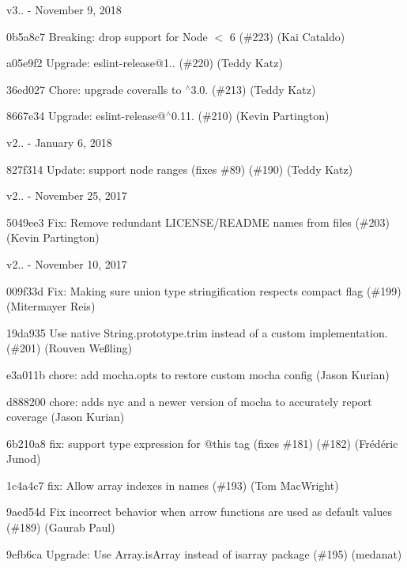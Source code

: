 v3.. -\/ November 9, 2018


\begin{DoxyItemize}
\item 0b5a8c7 Breaking\+: drop support for Node \texorpdfstring{$<$}{<} 6 (\#223) (Kai Cataldo)
\item a05e9f2 Upgrade\+: eslint-\/release@1.. (\#220) (Teddy Katz)
\item 36ed027 Chore\+: upgrade coveralls to $^\wedge$3.0. (\#213) (Teddy Katz)
\item 8667e34 Upgrade\+: eslint-\/release@$^\wedge$0.11. (\#210) (Kevin Partington)
\end{DoxyItemize}

v2.. -\/ January 6, 2018


\begin{DoxyItemize}
\item 827f314 Update\+: support node ranges (fixes \#89) (\#190) (Teddy Katz)
\end{DoxyItemize}

v2.. -\/ November 25, 2017


\begin{DoxyItemize}
\item 5049ee3 Fix\+: Remove redundant LICENSE/\+README names from files (\#203) (Kevin Partington)
\end{DoxyItemize}

v2.. -\/ November 10, 2017


\begin{DoxyItemize}
\item 009f33d Fix\+: Making sure union type stringification respects compact flag (\#199) (Mitermayer Reis)
\item 19da935 Use native String.\+prototype.\+trim instead of a custom implementation. (\#201) (Rouven Weßling)
\item e3a011b chore\+: add mocha.\+opts to restore custom mocha config (Jason Kurian)
\item d888200 chore\+: adds nyc and a newer version of mocha to accurately report coverage (Jason Kurian)
\item 6b210a8 fix\+: support type expression for @this tag (fixes \#181) (\#182) (Frédéric Junod)
\item 1c4a4c7 fix\+: Allow array indexes in names (\#193) (Tom Mac\+Wright)
\item 9aed54d Fix incorrect behavior when arrow functions are used as default values (\#189) (Gaurab Paul)
\item 9efb6ca Upgrade\+: Use Array.\+is\+Array instead of isarray package (\#195) (medanat)
\end{DoxyItemize}

